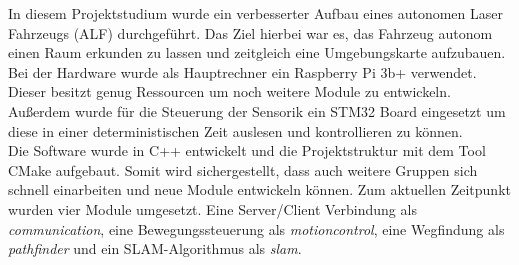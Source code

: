 
\vspace{15.0mm}




In diesem Projektstudium wurde ein verbesserter Aufbau eines autonomen Laser Fahrzeugs (ALF) durchgeführt. Das Ziel hierbei war es, das Fahrzeug autonom einen Raum erkunden zu lassen und zeitgleich eine Umgebungskarte aufzubauen.\\
Bei der Hardware wurde als Hauptrechner ein Raspberry Pi 3b+ verwendet. Dieser besitzt genug Ressourcen um noch weitere Module zu entwickeln. Außerdem wurde für die Steuerung der Sensorik ein STM32 Board eingesetzt um diese in einer deterministischen Zeit auslesen und kontrollieren zu können.\\
Die Software wurde in C++ entwickelt und die Projektstruktur mit dem Tool CMake aufgebaut. Somit wird sichergestellt, dass auch weitere Gruppen sich schnell einarbeiten und neue Module entwickeln können. Zum aktuellen Zeitpunkt wurden vier Module umgesetzt. Eine Server/Client Verbindung als \textit{communication}, eine Bewegungssteuerung als \textit{motioncontrol}, eine Wegfindung als \textit{pathfinder} und ein SLAM-Algorithmus als \textit{slam}. 